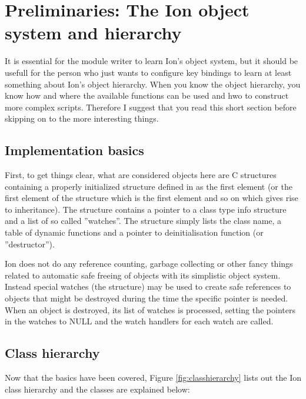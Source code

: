 
\section{Preliminaries: The Ion object system and hierarchy}

It is essential for the module writer to learn Ion's object system,
but it should be usefull for the person who just wants to configure
key bindings to learn at least something about Ion's object hierarchy.
When you know the object hierarchy, you know how and where the available
functions can be used and hwo to construct more complex scripts.
Therefore I suggest that you read this short section before skipping on
to the more interesting things.


\subsection{Implementation basics}

First, to get things clear, what are considered objects here are C
structures containing a properly initialized \type{}
structure defined in  as the first element (or the
first element of the structure which is the first element and so on which
gives rise to inheritance). The  structure contains a pointer
to a  class type info structure and
a list of so called ''watches''. The  structure simply
lists the class name, a table of dynamic functions and a pointer to
deinitialisation function (or ''destructor'').

Ion does not do any reference counting, garbage collecting or other
fancy things related to automatic safe freeing of objects with its
simplistic object system. Instead special watches (the 
 structure) may be used to create safe references to
objects that might be destroyed during the time the specific pointer is
needed. When an object is destroyed, its list of watches is processed,
setting the pointers in the watches to NULL and the watch handlers for
each watch are called. 

\subsection{Class hierarchy}

Now that the basics have been covered, Figure \ref{fig:classhierarchy}
lists out the Ion class hierarchy and the classes are explained below:

